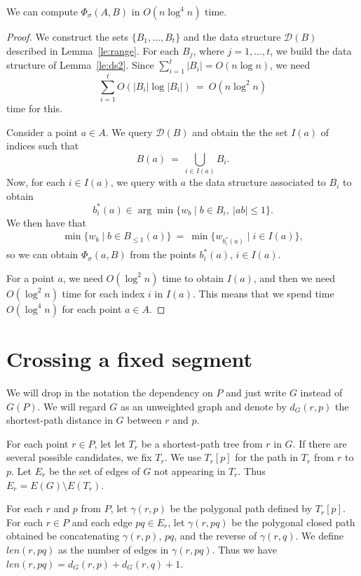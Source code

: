 \documentclass[a4paper,USenglish,numberwithinsect]{lipics}
\newcommand{\D}{\ensuremath{\mathcal{D}}}
\def\curve{\gamma}
\def\length{\mathit{len}}
\let\le\leqslant
\begin{document}
\begin{lemma}
\label{le:accross}
	We can compute $\Phi_\sigma(A,B)$ in $O(n\log^4 n)$ time.
\end{lemma}
\begin{proof}
	We construct the sets $\{ B_1,\dots, B_t \}$ and the data structure $\D (B)$
	described in Lemma~\ref{le:range}. For each $B_j$, where $j=1,\dots , t$, 
	we build the data structure of Lemma~\ref{le:ds2}. 
	Since $\sum_{i=1}^t |B_i| = O(n\log n)$,
	we need
	\[
		\sum_{i=1}^t O(|B_i| \log |B_i|) ~=~ O(n\log^2 n)
	\]
	time for this.
	
	Consider a point $a\in A$. We query $\D (B)$ and obtain the 
	the set $I(a)$ of indices such that 
	\[
		B(a) ~=~ \bigcup_{i\in I(a)} B_i.
	\]
	Now, for each $i\in I(a)$, we query with $a$ the data structure associated 
	to $B_i$ to obtain
	\[	
		b_i^*(a) \in \arg\min \{ w_b \mid b\in B_i,~|ab|\le 1\}.
	\]
	We then have that
	\begin{align*}
		\min \{ w_b \mid b\in B_{\le 1}(a)\} ~=~ \min \{ w_{b_i^*(a)}\mid i\in I(a) \},
	\end{align*}
	so we can obtain $\Phi_\sigma(a,B)$ from the points $b_i^*(a)$, $i\in I(a)$. 
	
	For a point $a$, we need $O(\log^2 n)$ time to obtain $I(a)$,
	and then we need $O(\log^2 n)$ time for each index $i$ in $I(a)$. This means that
	we spend time $O(\log^4 n)$ for each point $a\in A$. 
\end{proof}


\section{Crossing a fixed segment}

We will drop in the notation the dependency on $P$ and just write $G$ instead of $G(P)$.
We will regard $G$ as an unweighted graph and denote by $d_G(r,p)$ the shortest-path
distance in $G$ between $r$ and $p$. 

For each point $r\in P$, let let $T_r$ be a shortest-path tree from $r$ in $G$.
If there are several possible candidates, we fix $T_r$.
We use $T_r[p]$ for the path in $T_r$ from $r$ to $p$.
Let $E_r$ be the set of edges of $G$ not appearing in $T_r$. 
Thus $E_r=E(G)\setminus E(T_r)$.

For each $r$ and $p$ from $P$, let $\curve(r,p)$ be the polygonal path
defined by $T_r[p]$.
For each $r\in P$ and each edge $pq\in E_r$, 
let $\curve(r,pq)$ be the polygonal closed path
obtained be concatenating $\curve(r,p)$, $pq$, and the reverse of $\curve(r,q)$.
We define $\length(r,pq)$ as the number of edges in $\curve(r,pq)$.
Thus we have $\length(r,pq) = d_G(r,p)+d_G(r,q)+1$.
\end{document}
